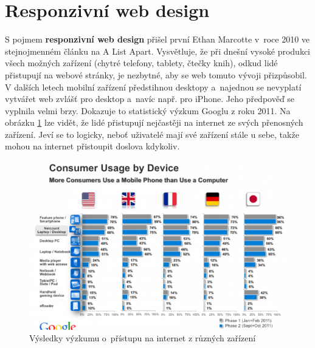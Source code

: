 \documentclass[thesis=B,czech]{FITthesis}[2012/06/26]
\begin{document}
\section{Responzivní web design} \label{sec:rd}


S pojmem \textbf{responzivní web design} přišel první Ethan Marcotte v~roce 2010 ve stejnojmenném článku na  A List Apart. Vysvětluje, že při dnešní vysoké produkci všech možných zařízení (chytré telefony, tablety, čtečky knih), odkud lidé přistupují na webové stránky, je nezbytné, aby se web tomuto vývoji  přizpůsobil. V dalších letech mobilní zařízení předstihnou desktopy a~najednou se nevyplatí vytvářet web zvlášť pro desktop a~navíc např. pro iPhone\cite{res}. Jeho předpověď se vyplnila velmi brzy. Dokazuje to statistický výzkum Googlu z roku 2011. Na obrázku \ref{imgStatG} lze vidět, že lidé přistupují nejčastěji na internet ze svých přenosných zařízení. Jeví se to logicky, neboť uživatelé mají své zařízení stále u sebe, takže mohou na internet přistoupit doslova kdykoliv.

\begin{figure}[h]
	\begin{center}
	\includegraphics[scale=0.7]{images/image01.png}
	\end{center}
	\caption{Výsledky výzkumu o~přístupu na internet z různých zařízení\cite{dev}}
	\label{imgStatG}
\end{figure}
\end{document}
